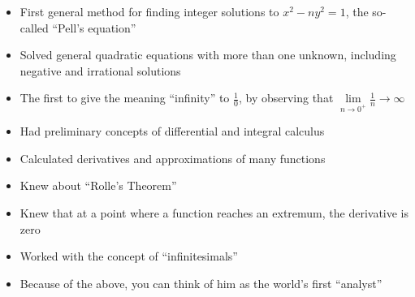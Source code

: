 \documentclass[class=article, crop=false]{standalone}
\begin{document}
\begin{itemize}
\begin{itemize}
      \item First general method for finding integer solutions to $x^2 - ny^2 = 1$, the so-called ``Pell's equation''
      \item Solved general quadratic equations with more than one unknown, including negative and irrational solutions
      \item The first to give the meaning ``infinity'' to $\frac{1}{0}$, by observing that $\lim\limits_{n\to 0^+} \frac{1}{n}\to\infty$
      \item Had preliminary concepts of differential and integral calculus
      \item Calculated derivatives and approximations of many functions
      \item Knew about ``Rolle's Theorem''
      \item Knew that at a point where a function reaches an extremum, the derivative is zero
      \item Worked with the concept of ``infinitesimals''
      \item Because of the above, you can think of him as the world's first ``analyst''
    \end{itemize}
  \end{itemize}
\end{document}
